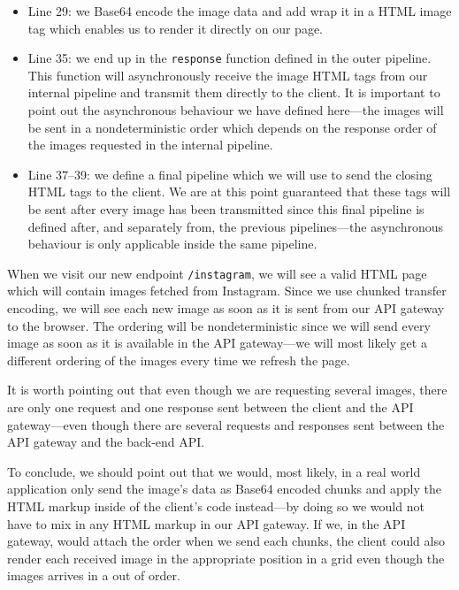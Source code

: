 \documentclass{cslthse-msc}
\begin{document}
\begin{itemize}
\item Line 29: we Base64 encode the image data and add wrap it in a HTML image tag which enables us to render it directly on our page.

\item Line 35: we end up in the \lstinline{response} function defined in the outer pipeline. This function will asynchronously receive the image HTML tags from our internal pipeline and transmit them directly to the client. It is important to point out the asynchronous behaviour we have defined here---the images will be sent in a nondeterministic order which depends on the response order of the images requested in the internal pipeline.

\item Line 37--39: we define a final pipeline which we will use to send the closing HTML tags to the client. We are at this point guaranteed that these tags will be sent after every image has been transmitted since this final pipeline is defined after, and separately from, the previous pipelines---the asynchronous behaviour is only applicable inside the same pipeline.

\end{itemize}

When we visit our new endpoint \lstinline{/instagram}, we will see a valid HTML page which will contain images fetched from Instagram. Since we use chunked transfer encoding, we will see each new image as soon as it is sent from our API gateway to the browser. The ordering will be nondeterministic since we will send every image as soon as it is available in the API gateway---we will most likely get a different ordering of the images every time we refresh the page.

It is worth pointing out that even though we are requesting several images, there are only one request and one response sent between the client and the API gateway---even though there are several requests and responses sent between the API gateway and the back-end API.

To conclude, we should point out that we would, most likely, in a real world application only send the image's data as Base64 encoded chunks and apply the HTML markup inside of the client's code instead---by doing so we would not have to mix in any HTML markup in our API gateway. If we, in the API gateway, would attach the order when we send each chunks, the client could also render each received image in the appropriate position in a grid even though the images arrives in a out of order.
\end{document}
